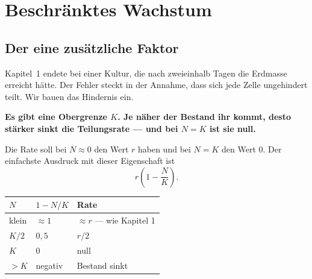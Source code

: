 \chapter{Beschränktes Wachstum}

\section{Der eine zusätzliche Faktor}

Kapitel~1 endete bei einer Kultur, die nach zweieinhalb Tagen die Erdmasse erreicht hätte. Der Fehler steckt in der Annahme, dass sich jede Zelle ungehindert teilt. Wir bauen das Hindernis ein.

\begin{merksatz}
\begin{center}
\begin{minipage}{0.9\textwidth}
\textbf{Es gibt eine Obergrenze $K$. Je näher der Bestand ihr kommt, desto stärker sinkt die Teilungsrate --- und bei $N = K$ ist sie null.}
\end{minipage}
\end{center}

Die Rate soll bei $N \approx 0$ den Wert $r$ haben und bei $N = K$ den Wert $0$. Der einfachste Ausdruck mit dieser Eigenschaft ist
\[ r\left(1 - \frac{N}{K}\right) . \]

\begin{center}
\renewcommand{\arraystretch}{1.48}
\begin{tabular}{@{}P{2.0cm}P{2.6cm}P{3.0cm}@{}}
\toprule
$N$ & $1 - N/K$ & \textbf{Rate}\\
\midrule
klein & $\approx 1$ & $\approx r$ --- wie Kapitel 1\\
$K/2$ & $0{,}5$ & $r/2$\\
$K$ & $0$ & \textcolor{akzent}{null}\\
$> K$ & negativ & \textcolor{akzent}{Bestand sinkt}\\
\bottomrule
\end{tabular}
\end{center}

\begin{center}
\begin{minipage}{0.88\textwidth}
\end{minipage}
\end{center}
\end{merksatz}

